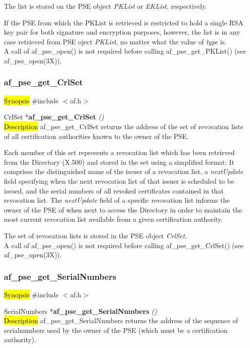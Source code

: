 The list is stored on the PSE object {\em PKList} or {\em EKList}, respectively.

If the PSE from which the PKList is retrieved is restricted to hold a single RSA key pair
for both signature and encryption purposes, however, the list is in any case retrieved from PSE oject {\em PKList},
no matter what the value of {\em type} is.
\\ [1em]
A call of af\_pse\_open() is not required before calling af\_pse\_get\_PKList()
(see af\_pse\_open(3X)).


\subsubsection{af\_pse\_get\_CrlSet}
\label{af_get_CrlSet}
\hl{Synopsis}
\#include $<$af.h$>$

CrlSet *{\bf af\_pse\_get\_CrlSet} {\em ()} \\
\hl{Description}
af\_pse\_get\_CrlSet returns the address of the set of revocation lists of all
certification authorities known to the owner of the PSE.

Each member of this set represents a revocation list which has been retrieved from 
the Directory (X.500) and stored in the set using a simplified format: It comprises the distinguished
name of the issuer of a revocation list, a {\em nextUpdate} field specifying when the next
revocation list of that issuer is scheduled to be issued, and the serial numbers of all revoked
certificates contained in that revocation list. The {\em nextUpdate} field of a specific 
revocation list informs the owner of the PSE of when next to access the 
Directory in order to maintain the most current revocation list available from a given
certification authority. 

The set of revocation lists is stored in the PSE object {\em CrlSet}.
\\ [1em]
A call of af\_pse\_open() is not required before calling af\_pse\_get\_CrlSet()
(see af\_pse\_open(3X)).


\subsubsection{af\_pse\_get\_SerialNumbers}
\label{af_get_SerialNumbers}
\hl{Synopsis}
\#include $<$af.h$>$

SerialNumbers *{\bf af\_pse\_get\_SerialNumbers} {\em ()} \\
\hl{Description}
af\_pse\_get\_SerialNumbers returns the address of the sequence of serialnumbers
used by the owner of the PSE (which must be a certification authority).


